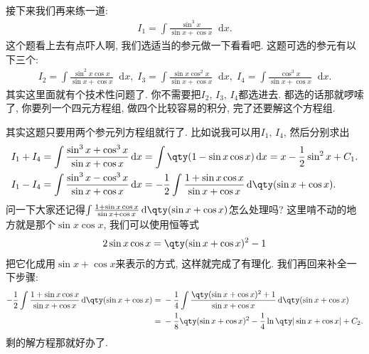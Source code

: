 \documentclass{ctexbook}
\newcommand*{\dif}{\mathop{}\!\mathrm{d}}
\begin{document}
{接下来我们再来练一道: 
\begin{align*}
I_{1}=\int\frac{\sin^{3}{x}}{\sin{x}+\cos{x}}\dif{x}
.\end{align*}
这个题看上去有点吓人啊, 我们选适当的参元做一下看看吧. 这题可选的参元有以下三个: 
\begin{align*}
I_{2}=\int\frac{\sin^{2}{x}\cos{x}}{\sin{x}+\cos{x}}\dif{x},\;I_{3}=\int\frac{\sin{x}\cos^{2}{x}}{\sin{x}+\cos{x}}\dif{x},\;I_{4}=\int\frac{\cos^{3}{x}}{\sin{x}+\cos{x}}\dif{x}
.\end{align*}
其实这里面就有个技术性问题了. 你不需要把$I_{2},\,I_{3},\,I_{4}$都选进去. 都选的话那就啰嗦了, 你要列一个四元方程组, 做四个比较容易的积分, 完了还要解这个方程组. \par
其实这题只要用两个参元列方程组就行了. 比如说我可以用$I_{1},\,I_{4}$, 然后分别求出
\begin{align*}
{}&I_{1}+I_{4}=\int\frac{\sin^{3}{x}+\cos^{3}{x}}{\sin{x}+\cos{x}}\dif{x}=\int\qty(1-\sin{x}\cos{x})\dif{x}=x-\frac{1}{2}\sin^{2}{x}+C_{1}.\\
{}&I_{1}-I_{4}=\int\frac{\sin^{3}{x}-\cos^{3}{x}}{\sin{x}+\cos{x}}\dif{x}=-\frac{1}{2}\int\frac{1+\sin{x}\cos{x}}{\sin{x}+\cos{x}}\dif{\qty(\sin{x}+\cos{x})}
.\end{align*}
问一下大家还记得$\int\frac{1+\sin{x}\cos{x}}{\sin{x}+\cos{x}}\dif{\qty(\sin{x}+\cos{x})}$怎么处理吗? 这里啃不动的地方就是那个$\sin{x}\cos{x}$, 我们可以使用恒等式
\begin{align*}
2\sin{x}\cos{x}=\qty(\sin{x}+\cos{x})^{2}-1
\end{align*}
把它化成用$\sin{x}+\cos{x}$来表示的方式, 这样就完成了有理化. 我们再回来补全一下步骤: 
\begin{align*}
-\frac{1}{2}\int\frac{1+\sin{x}\cos{x}}{\sin{x}+\cos{x}}\dif{\qty(\sin{x}+\cos{x})}={}&-\frac{1}{4}\int\frac{\qty(\sin{x}+\cos{x})^{2}+1}{\sin{x}+\cos{x}}\dif{\qty(\sin{x}+\cos{x})}\\
={}&-\frac{1}{8}\qty(\sin{x}+\cos{x})^{2}-\frac{1}{4}\ln\qty|\sin{x}+\cos{x}|+C_{2}
.\end{align*}
剩的解方程那就好办了. \par
}
\end{document}
